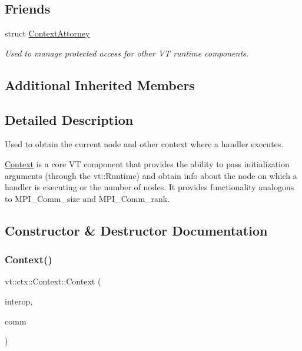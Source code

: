 \subsection*{Friends}
\begin{DoxyCompactItemize}
\item 
struct \hyperlink{structvt_1_1ctx_1_1_context_a75c33a90ea59b21ab5375343af0f8e26}{Context\+Attorney}
\begin{DoxyCompactList}\small\item\em Used to manage protected access for other VT runtime components. \end{DoxyCompactList}\end{DoxyCompactItemize}
\subsection*{Additional Inherited Members}


\subsection{Detailed Description}
Used to obtain the current node and other context where a handler executes. 

\hyperlink{structvt_1_1ctx_1_1_context}{Context} is a core VT component that provides the ability to pass initialization arguments (through the {\ttfamily vt\+::\+Runtime}) and obtain info about the node on which a handler is executing or the number of nodes. It provides functionality analogous to {\ttfamily M\+P\+I\+\_\+\+Comm\+\_\+size} and {\ttfamily M\+P\+I\+\_\+\+Comm\+\_\+rank}. 

\subsection{Constructor \& Destructor Documentation}
\mbox{\label{structvt_1_1ctx_1_1_context_aa00297fe6a9bde8202b4099ede6069fc}} 
\subsubsection{\texorpdfstring{Context()}{Context()}}
{\footnotesize\ttfamily vt\+::ctx\+::\+Context\+::\+Context (\begin{DoxyParamCaption}\item[{bool const}]{interop,  }\item[{M\+P\+I\+\_\+\+Comm}]{comm }\end{DoxyParamCaption})}



